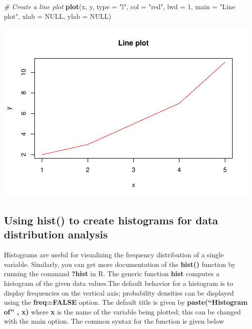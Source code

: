 \documentclass[
]{book}
\newenvironment{Shaded}{\begin{snugshade}}{\end{snugshade}}
\newcommand{\AttributeTok}[1]{\textcolor[rgb]{0.13,0.29,0.53}{#1}}
\newcommand{\CommentTok}[1]{\textcolor[rgb]{0.56,0.35,0.01}{\textit{#1}}}
\newcommand{\ConstantTok}[1]{\textcolor[rgb]{0.56,0.35,0.01}{#1}}
\newcommand{\DecValTok}[1]{\textcolor[rgb]{0.00,0.00,0.81}{#1}}
\newcommand{\FunctionTok}[1]{\textcolor[rgb]{0.13,0.29,0.53}{\textbf{#1}}}
\newcommand{\NormalTok}[1]{#1}
\newcommand{\StringTok}[1]{\textcolor[rgb]{0.31,0.60,0.02}{#1}}
\begin{document}
\begin{Shaded}
\begin{Highlighting}[]
\CommentTok{\# Create a line plot}
\FunctionTok{plot}\NormalTok{(x, y, }\AttributeTok{type =} \StringTok{"l"}\NormalTok{, }\AttributeTok{col =} \StringTok{"red"}\NormalTok{, }\AttributeTok{lwd =} \DecValTok{1}\NormalTok{, }\AttributeTok{main =} \StringTok{"Line plot"}\NormalTok{, }\AttributeTok{xlab =} \ConstantTok{NULL}\NormalTok{, }\AttributeTok{ylab =} \ConstantTok{NULL}\NormalTok{)}
\end{Highlighting}
\end{Shaded}

\includegraphics{_main_files/figure-latex/unnamed-chunk-25-2.pdf}

\subsection{Using hist() to create histograms for data distribution analysis}\label{using-hist-to-create-histograms-for-data-distribution-analysis}

Histograms are useful for visualizing the frequency distribution of a single variable. Similarly, you can get more documentation of the \textbf{hist()} function by running the command \textbf{?hist} in R. The generic function \textbf{hist} computes a histogram of the given data values.The default behavior for a histogram is to display frequencies on the vertical axis; probability densities can be displayed using the \textbf{freq=FALSE} option. The default title is given by \textbf{paste(``Histogram of'' , x)} where \textbf{x} is the name of the variable being plotted; this can be changed with the main option. The common syntax for the function is given below
\end{document}
